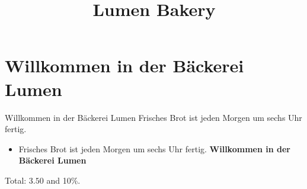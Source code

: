 \documentclass{article}
\title{Lumen Bakery}
\begin{document}
\maketitle
\section{Willkommen in der Bäckerei Lumen}
Willkommen in der Bäckerei Lumen
Frisches Brot ist jeden Morgen um sechs Uhr fertig.

\begin{itemize}
\item Frisches Brot ist jeden Morgen um sechs Uhr fertig. \textbf{Willkommen in der Bäckerei Lumen}
\end{itemize}
Total: $3.50$ and 10\%.
\end{document}
